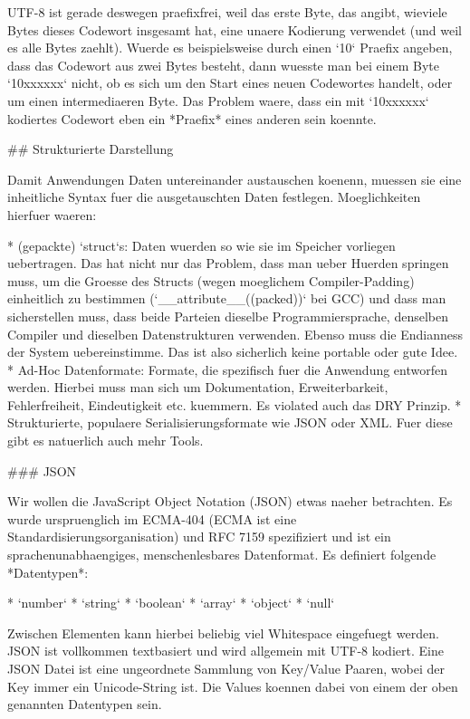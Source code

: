 UTF-8 ist gerade deswegen praefixfrei, weil das erste Byte, das angibt, wieviele
Bytes dieses Codewort insgesamt hat, eine unaere Kodierung verwendet (und weil
es alle Bytes zaehlt). Wuerde es beispielsweise durch einen `10` Praefix
angeben, dass das Codewort aus zwei Bytes besteht, dann wuesste man bei einem
Byte `10xxxxxx` nicht, ob es sich um den Start eines neuen Codewortes handelt,
oder um einen intermediaeren Byte. Das Problem waere, dass ein mit `10xxxxxx`
kodiertes Codewort eben ein *Praefix* eines anderen sein koennte.

## Strukturierte Darstellung

Damit Anwendungen Daten untereinander austauschen koenenn, muessen sie eine
inheitliche Syntax fuer die ausgetauschten Daten festlegen. Moeglichkeiten
hierfuer waeren:

* (gepackte) `struct`s: Daten wuerden so wie sie im Speicher vorliegen
  uebertragen. Das hat nicht nur das Problem, dass man ueber Huerden springen
  muss, um die Groesse des Structs (wegen moeglichem Compiler-Padding)
  einheitlich zu bestimmen (`__attribute__((packed))` bei GCC) und dass man
  sicherstellen muss, dass beide Parteien dieselbe Programmiersprache, denselben
  Compiler und dieselben Datenstrukturen verwenden. Ebenso muss die Endianness
  der System uebereinstimme. Das ist also sicherlich keine portable oder gute
  Idee.
* Ad-Hoc Datenformate: Formate, die spezifisch fuer die Anwendung entworfen
  werden. Hierbei muss man sich um Dokumentation, Erweiterbarkeit,
  Fehlerfreiheit, Eindeutigkeit etc. kuemmern. Es violated auch das DRY Prinzip.
* Strukturierte, populaere Serialisierungsformate wie JSON oder XML. Fuer diese
  gibt es natuerlich auch mehr Tools.

### JSON

Wir wollen die JavaScript Object Notation (JSON) etwas naeher betrachten. Es
wurde urspruenglich im ECMA-404 (ECMA ist eine Standardisierungsorganisation)
und RFC 7159 spezifiziert und ist ein sprachenunabhaengiges, menschenlesbares
Datenformat. Es definiert folgende *Datentypen*:

* `number`
* `string`
* `boolean`
* `array`
* `object`
* `null`

Zwischen Elementen kann hierbei beliebig viel Whitespace eingefuegt werden. JSON
ist vollkommen textbasiert und wird allgemein mit UTF-8 kodiert. Eine JSON Datei
ist eine ungeordnete Sammlung von Key/Value Paaren, wobei der Key immer ein
Unicode-String ist. Die Values koennen dabei von einem der oben genannten
Datentypen sein.

